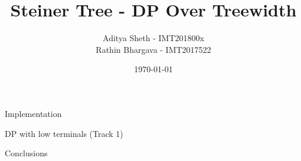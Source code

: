 \documentclass[letterpaper,12pt]{article}
\theoremstyle{plain}
\theoremstyle{definition}
\theoremstyle{remark}
\begin{document}
	
	\title{Steiner Tree - DP Over Treewidth}
	\author{Aditya Sheth - IMT201800x \\ Rathin Bhargava - IMT2017522}
	\date{\today}
	\maketitle
	\tableofcontents
	\newpage

%    
  
  
    
   
    
    
    
    
    
    \begin{section}{Implementation}
    
    \end{section}
    
    \begin{section}{DP with low terminals (Track 1)}
    
    \end{section}
    
    
    
    \begin{section}{Conclusions}
        
    \end{section}
    
	
	
	
	
\end{document}
